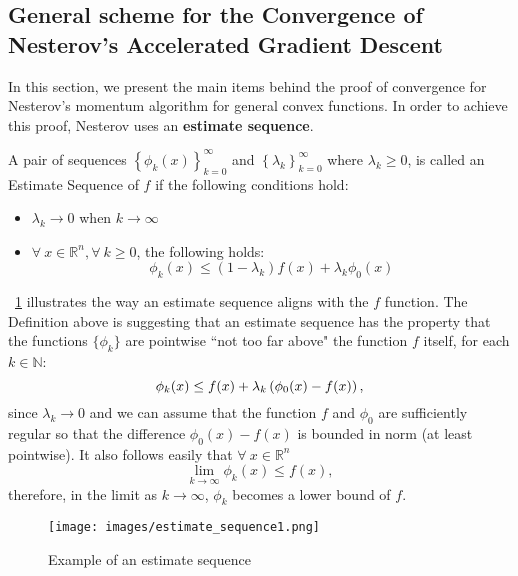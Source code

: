 \documentclass{article}
\begin{document}
\subsection{General scheme for the Convergence of Nesterov's Accelerated Gradient Descent}
In this section, we present the main items behind the proof of convergence for Nesterov's momentum algorithm for general convex functions. In order to achieve this proof, Nesterov uses an \textbf{estimate sequence}.

\begin{defn}
A pair of sequences $\left\{ \phi_k(x) \right\}_{k=0}^\infty$ and $\left\{ \lambda_k \right\}_{k=0}^\infty$ where $\lambda_k \geq 0$, is called an Estimate Sequence of $f$ if the following conditions hold:
\begin{itemize}
\item $\lambda_k \mathop{\to} 0$ when $k \to \infty$
\item $\forall \ x \in \mathbb{R}^n, \forall \ k \geq 0$, the following holds: 
\[
\phi_k(x) \leq (1- \lambda_k) f(x) + \lambda_k \phi_0 (x)
\]
\end{itemize}
\label{defEstim}
\end{defn}

\figurename \ \ref{figEstim} illustrates the way an estimate sequence aligns with the $f$ function. The Definition above is suggesting that an estimate sequence has the property that the functions $\{\phi_k\}$ are pointwise ``not too far above" the function $f$ itself, for each $k\in \mathbb{N}$: 
$$ \phi_k(x) \leq f(x) + \lambda_k\left( \phi_0 (x)-f(x) \right), $$
since $\lambda_k \to 0$ and we can assume that the function $f$ and $\phi_0$ are sufficiently regular so that the difference $ \phi_0 (x)-f(x)$ is bounded in norm (at least pointwise). It also follows easily that $\forall \ x \in \mathbb{R}^n$
\begin{equation} \lim_{k\to\infty}{\phi_k(x)} \leq f(x),
\end{equation}
therefore, in the limit as $k \to \infty$, $\phi_k$ becomes a lower bound of $f$. \\


\begin{figure}
  \centering
  \texttt{[image: images/estimate\_sequence1.png]}
  \caption{Example of an estimate sequence}
  \label{figEstim}
\end{figure}
\end{document}
